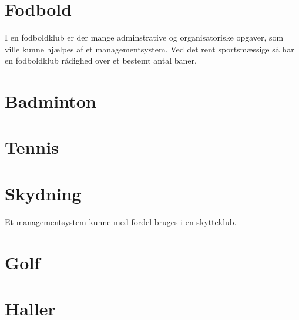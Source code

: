 \section{Fodbold}
I en fodboldklub er der mange adminstrative og organisatoriske opgaver, som ville kunne hjælpes af et managementsystem. Ved det rent sportsmæssige så har en fodboldklub rådighed over et bestemt antal baner. 


\section{Badminton}

\section{Tennis}

\section{Skydning}
Et managementsystem kunne med fordel bruges i en skytteklub. 

\section{Golf}

\section{Haller}
